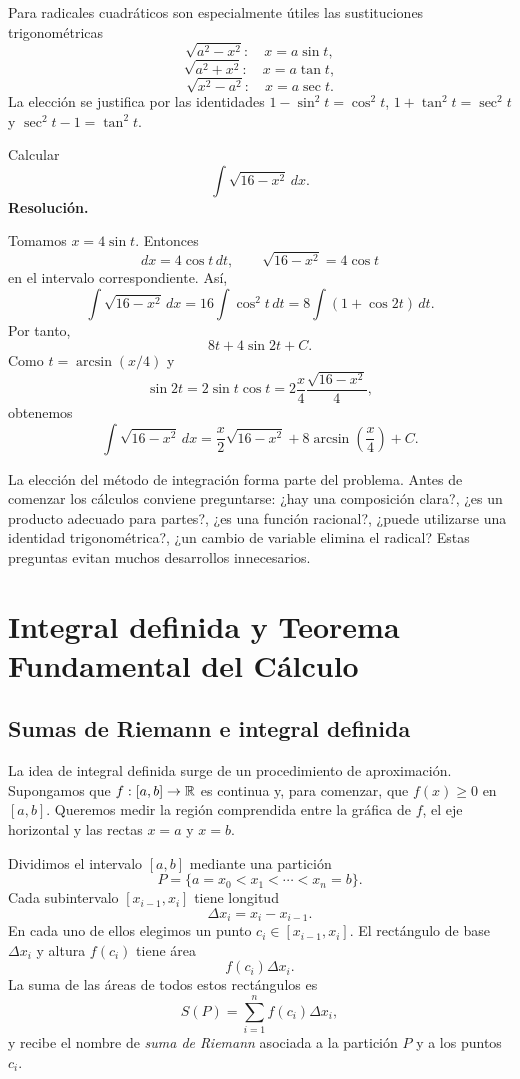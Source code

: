Para radicales cuadráticos son especialmente útiles las sustituciones trigonométricas
\[
\sqrt{a^2-x^2}:\quad x=a\sin t,
\]
\[
\sqrt{a^2+x^2}:\quad x=a\tan t,
\]
\[
\sqrt{x^2-a^2}:\quad x=a\sec t.
\]
La elección se justifica por las identidades $1-\sin^2t=\cos^2t$, $1+\tan^2t=\sec^2t$ y $\sec^2t-1=\tan^2t$.

\begin{solvedexercise}
Calcular
\[
\int\sqrt{16-x^2}\,dx.
\]
\tcblower
\textbf{Resolución.}\par\smallskip
Tomamos $x=4\sin t$. Entonces
\[
dx=4\cos t\,dt,
\qquad
\sqrt{16-x^2}=4\cos t
\]
en el intervalo correspondiente. Así,
\[
\int\sqrt{16-x^2}\,dx
=16\int\cos^2t\,dt
=8\int(1+\cos2t)\,dt.
\]
Por tanto,
\[
8t+4\sin2t+C.
\]
Como $t=\arcsin(x/4)$ y
\[
\sin2t=2\sin t\cos t
=2\frac{x}{4}\frac{\sqrt{16-x^2}}{4},
\]
obtenemos
\[
\boxed{\int\sqrt{16-x^2}\,dx
=\frac{x}{2}\sqrt{16-x^2}+8\arcsin\left(\frac{x}{4}\right)+C.}
\]
\end{solvedexercise}

La elección del método de integración forma parte del problema. Antes de comenzar los cálculos conviene preguntarse: ¿hay una composición clara?, ¿es un producto adecuado para partes?, ¿es una función racional?, ¿puede utilizarse una identidad trigonométrica?, ¿un cambio de variable elimina el radical? Estas preguntas evitan muchos desarrollos innecesarios.

\section{Integral definida y Teorema Fundamental del Cálculo}
\label{sec:integral-definida}

\subsection{Sumas de Riemann e integral definida}

La idea de integral definida surge de un procedimiento de aproximación. Supongamos que $f:[a,b]\to\mathbb{R}$ es continua y, para comenzar, que $f(x)\geq0$ en $[a,b]$. Queremos medir la región comprendida entre la gráfica de $f$, el eje horizontal y las rectas $x=a$ y $x=b$.

Dividimos el intervalo $[a,b]$ mediante una partición
\[
P=\{a=x_0<x_1<\cdots<x_n=b\}.
\]
Cada subintervalo $[x_{i-1},x_i]$ tiene longitud
\[
\Delta x_i=x_i-x_{i-1}.
\]
En cada uno de ellos elegimos un punto $c_i\in[x_{i-1},x_i]$. El rectángulo de base $\Delta x_i$ y altura $f(c_i)$ tiene área
\[
f(c_i)\Delta x_i.
\]
La suma de las áreas de todos estos rectángulos es
\[
S(P)=\sum_{i=1}^{n} f(c_i)\Delta x_i,
\]
y recibe el nombre de \emph{suma de Riemann} asociada a la partición $P$ y a los puntos $c_i$.

